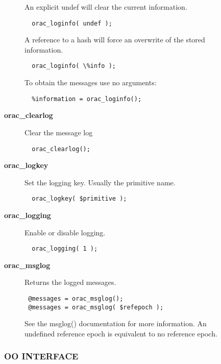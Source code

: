 \begin{description}
\begin{description}
\begin{description}
An explicit undef will clear the current information.

\begin{verbatim}
  orac_loginfo( undef );
\end{verbatim}


A reference to a hash will force an overwrite of the stored information.

\begin{verbatim}
  orac_loginfo( \%info );
\end{verbatim}


To obtain the messages use no arguments:

\begin{verbatim}
  %information = orac_loginfo();
\end{verbatim}

\item[{\textbf{orac\_clearlog}}] \mbox{}

Clear the message log

\begin{verbatim}
  orac_clearlog();
\end{verbatim}

\item[{\textbf{orac\_logkey}}] \mbox{}

Set the logging key. Usually the primitive name.

\begin{verbatim}
  orac_logkey( $primitive );
\end{verbatim}

\item[{\textbf{orac\_logging}}] \mbox{}

Enable or disable logging.

\begin{verbatim}
  orac_logging( 1 );
\end{verbatim}

\item[{\textbf{orac\_msglog}}] \mbox{}

Returns the logged messages.

\begin{verbatim}
 @messages = orac_msglog();
 @messages = orac_msglog( $refepoch );
\end{verbatim}


See the msglog() documentation for more information. An undefined reference
epoch is equivalent to no reference epoch.

\end{description}
\subsubsection*{OO INTERFACE\label{ORAC::Print_OO_INTERFACE}}



\end{description}
\end{description}
